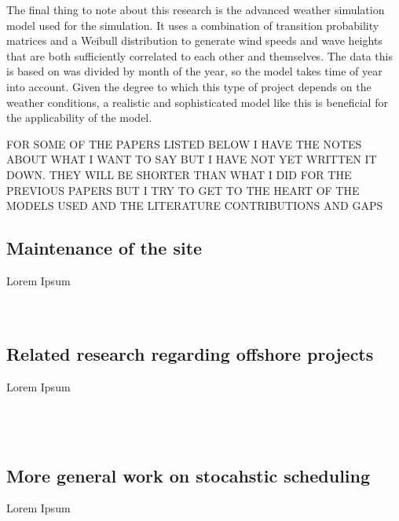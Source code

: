 \documentclass[a4paper,12pt]{article}
\begin{document}
The final thing to note about this research is the advanced weather simulation model used for the simulation. It uses a combination of transition probability matrices and a Weibull distribution to generate wind speeds and wave heights that are both sufficiently correlated to each other and themselves. The data this is based on was divided by month of the year, so the model takes time of year into account. Given the degree to which this type of project depends on the weather conditions, a realistic and sophisticated model like this is beneficial for the applicability of the model. 

\bigskip

FOR SOME OF THE PAPERS LISTED BELOW I HAVE THE NOTES ABOUT WHAT I WANT TO SAY BUT I HAVE NOT YET WRITTEN IT DOWN. THEY WILL BE SHORTER THAN WHAT I DID FOR THE PREVIOUS PAPERS BUT I TRY TO GET TO THE HEART OF THE MODELS USED AND THE LITERATURE CONTRIBUTIONS AND GAPS

\cite{barlow2017using}

\subsection{Maintenance of the site} \label{ss:maint}
Lorem Ipsum \\ 
\cite{dinwoodie2012analysis} \\
\cite{merigaud2016condition} \\

\subsection{Related research regarding offshore projects} \label{ss:offsh}
Lorem Ipsum \\
\cite{barlow2014assessment} \\
\cite{barlow2014support} \\
\cite{leggate2010crew} \\
\cite{perez2013offshore}

\subsection{More general work on stocahstic scheduling} \label{ss:stoch}
Lorem Ipsum \\
\cite{herroelen2005project} \\
\cite{sevaux2002genetic} \\
\cite{artigues2000polynomial}

\pagebreak
\end{document}
